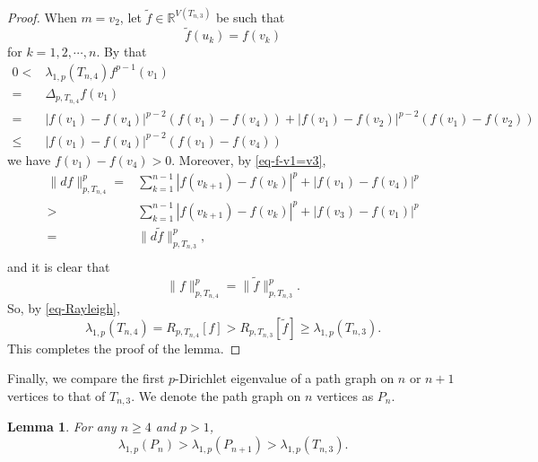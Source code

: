 \documentclass[12pt]{amsart}
\def\R{\mathbb{R}}
\def\wt{\widetilde}
\newtheorem{lem}{Lemma}[section]
\theoremstyle{definition}
\theoremstyle{remark}
\numberwithin{equation}{section}
\begin{document}
\begin{proof}
When $m=v_2$, let $\wt f\in \R^{V(T_{n,3})}$ be such that
\begin{equation*}
\wt f(u_k)=f(v_k)
\end{equation*}
for $k=1,2,\cdots,n$. By that
\begin{equation*}
\begin{split}
0<&\lambda_{1,p}(T_{n,4})f^{p-1}(v_1)\\
=&\Delta_{p,T_{n,4}} f(v_1)\\
=&|f(v_1)-f(v_4)|^{p-2}(f(v_1)-f(v_4))+|f(v_1)-f(v_2)|^{p-2}(f(v_1)-f(v_2))\\
\leq& |f(v_1)-f(v_4)|^{p-2}(f(v_1)-f(v_4))
\end{split}
\end{equation*}
we have $f(v_1)-f(v_4)>0$. Moreover, by \eqref{eq-f-v1=v3}, 
\begin{equation*}
\begin{split}
\|df\|_{p,T_{n,4}}^p=&\sum_{k=1}^{n-1}|f(v_{k+1})-f(v_k)|^{p}+|f(v_1)-f(v_4)|^p\\
>&\sum_{k=1}^{n-1}|f(v_{k+1})-f(v_k)|^p+|f(v_3)-f(v_1)|^p\\
=&\|d\wt f\|_{p,T_{n,3}}^p,\\
\end{split}
\end{equation*}
and it is clear that
$$\|f\|_{p,T_{n,4}}^p=\|\wt f\|_{p,T_{n,3}}^p.$$
So, by \eqref{eq-Rayleigh},
$$\lambda_{1,p}(T_{n,4})=R_{p,T_{n,4}}[f]>R_{p,T_{n,3}}[\wt f]\geq \lambda_{1,p}(T_{n,3}).$$
This completes the proof of the lemma.
\end{proof}
Finally, we compare the first $p$-Dirichlet eigenvalue of a path graph on $n$ or $n+1$ vertices to that of $T_{n,3}$. We denote the path graph on $n$ vertices as $P_n$.
\begin{lem}\label{lem-comparison-path}
For any $n\geq 4$ and $p>1$,
$$\lambda_{1,p}(P_n)>\lambda_{1,p}(P_{n+1})>\lambda_{1,p}(T_{n,3}).$$
\end{lem}
\end{document}
